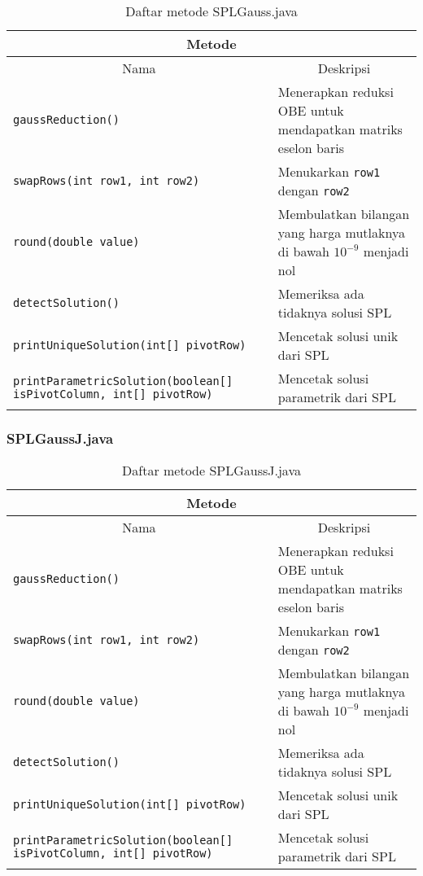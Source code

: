 \begin{table}[H]
    \centering
    \caption{Daftar metode SPLGauss.java}
    \begin{tabular}{p{}|p{}}
        \hline
        \hline
        \multicolumn{2}{c}{\textbf{Metode}}\\
        \hline
        \hline
         \multicolumn{1}{c|}{Nama}  & \multicolumn{1}{c}{Deskripsi} \\
         \hline 
         \hline 
         \verb+gaussReduction()+                        &  Menerapkan reduksi OBE untuk mendapatkan matriks eselon baris \\[.5em]
         \verb+swapRows(int row1, int row2)+            &  Menukarkan \verb+row1+ dengan \verb+row2+ \\[.5em]
         \verb+round(double value)+                     & Membulatkan bilangan yang harga mutlaknya di bawah $10^{-9}$ menjadi nol \\[.5em]
         \verb+detectSolution()+                        & Memeriksa ada tidaknya solusi SPL \\[.5em]
         \texttt{printUniqueSolution(int[] pivotRow)}   & Mencetak solusi unik dari SPL \\[.5em]
         \texttt{printParametricSolution(boolean[] isPivotColumn, int[] pivotRow)}   & Mencetak solusi parametrik dari SPL
    \end{tabular}
\end{table}

\subsubsection{SPLGaussJ.java}

\begin{table}[H]
    \centering
    \caption{Daftar metode SPLGaussJ.java}
    \begin{tabular}{p{}|p{}}
        \hline
        \hline
        \multicolumn{2}{c}{\textbf{Metode}}\\
        \hline
        \hline
        \multicolumn{1}{c|}{Nama}  & \multicolumn{1}{c}{Deskripsi} \\
        \hline 
        \hline 
         \verb+gaussReduction()+                        &  Menerapkan reduksi OBE untuk mendapatkan matriks eselon baris \\[.5em]
         \verb+swapRows(int row1, int row2)+            &  Menukarkan \verb+row1+ dengan \verb+row2+ \\[.5em]
         \verb+round(double value)+                     & Membulatkan bilangan yang harga mutlaknya di bawah $10^{-9}$ menjadi nol \\[.5em]
         \verb+detectSolution()+                        & Memeriksa ada tidaknya solusi SPL \\[.5em]
         \texttt{printUniqueSolution(int[] pivotRow)}   & Mencetak solusi unik dari SPL \\[.5em]
         \texttt{printParametricSolution(boolean[] isPivotColumn, int[] pivotRow)}   & Mencetak solusi parametrik dari SPL
    \end{tabular}
\end{table}

